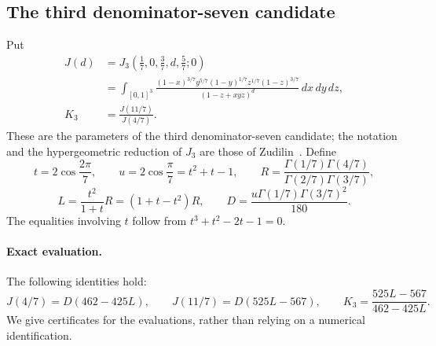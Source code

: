 \documentclass[11pt,a4paper]{article}
\theoremstyle{definition}
\theoremstyle{remark}
\numberwithin{equation}{section}
\begin{document}
\subsection{The third denominator-seven candidate}
\label{extra7-sec:target3}

Put
\begin{align*}
 J(d)&=J_3\left(\frac17,0,\frac37,d,\frac57;0\right)\\
 &=\int_{[0,1]^3}
 \frac{(1-x)^{3/7}y^{5/7}(1-y)^{1/7}z^{1/7}(1-z)^{3/7}}
 {(1-z+xyz)^d}\,dx\,dy\,dz,\\
 K_3&=\frac{J(11/7)}{J(4/7)}.
\end{align*}
These are the parameters of the third denominator-seven candidate; the
notation and the hypergeometric reduction of $J_3$ are those of
Zudilin~\cite{extra8-zudilin}.  Define
\[
 t=2\cos\frac{2\pi}{7},\qquad u=2\cos\frac{\pi}{7}=t^2+t-1,
 \qquad
 R=\frac{\Gamma(1/7)\Gamma(4/7)}{\Gamma(2/7)\Gamma(3/7)},
\]
\[
 L=\frac{t^2}{1+t}R=(1+t-t^2)R,
 \qquad D=\frac{u\Gamma(1/7)\Gamma(3/7)^2}{180}.
\]
The equalities involving $t$ follow from
$t^3+t^2-2t-1=0$.

\paragraph{Exact evaluation.}
The following identities hold:
\begin{equation}
 \label{extra7-eq:t3-evaluation}
 J(4/7)=D(462-425L),\qquad
 J(11/7)=D(525L-567),\qquad
 K_3=\frac{525L-567}{462-425L}.
\end{equation}
We give certificates for the evaluations, rather than relying on a
numerical identification.
\end{document}
